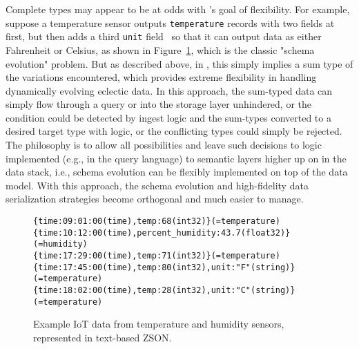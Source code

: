 Complete types may appear to be at odds with \sys{}'s goal of flexibility. For example, suppose a temperature sensor outputs \texttt{temperature} records with two fields at first, but then adds a third \texttt{unit} field~ so that it can output data as either Fahrenheit or Celsius, as shown in Figure~\ref{f:iot_data}, which is the classic "schema evolution" problem.  But as described above, in \sys{}, this simply implies a sum type of the variations encountered, which provides extreme flexibility in handling dynamically evolving eclectic data.  In this approach, the sum-typed data can simply flow through a query or into the storage layer unhindered, or the condition could be detected by ingest logic and the sum-types converted to a desired target type with \sys{} logic, or the conflicting types could simply be rejected.  The \sys{} philosophy is to allow all possibilities and leave such decisions to logic implemented (e.g., in the \sys{} query language) to semantic layers higher up on in the data stack, i.e., schema evolution can be flexibly implemented on top of the \sys{} data model.  With this approach, the schema evolution and high-fidelity data serialization strategies become orthogonal and much easier to manage.

\begin{comment}
\begin{figure}
    \begin{verbatim}
{city:"Augusta"(string),population:18662(uint32)}(=city_schema)
{city:"Bangor"(string),population:32029(uint32)}(=city_schema)
{city:"Bar Harbor"(string),population:5535(uint32)}(=city_schema)
{city:"Bath"(string),state:"ME"(string),population:8333(uint32)} (=city_schema)
{city:"Belfast"(string),state:"ME"(string),population: 6710(uint32)}(=city_schema)
    \end{verbatim}
    \vspace{-1em}
    \caption{Example \sys{} data, represented in text-based ZSON.}
    \label{f:city_data}
\end{figure}
\end{comment}

\begin{figure}
    \begin{verbatim}
{time:09:01:00(time),temp:68(int32)}(=temperature)
{time:10:12:00(time),percent_humidity:43.7(float32)}(=humidity)
{time:17:29:00(time),temp:71(int32)}(=temperature)
{time:17:45:00(time),temp:80(int32),unit:"F"(string)}(=temperature)
{time:18:02:00(time),temp:28(int32),unit:"C"(string)}(=temperature)
    \end{verbatim}
    \vspace{-1.3em}
    \caption{Example IoT data from temperature and humidity sensors, represented in text-based ZSON.\shortorlongform{}{\footnotemark}}
    \label{f:iot_data}
    \vspace{-1.5em}
\end{figure}

